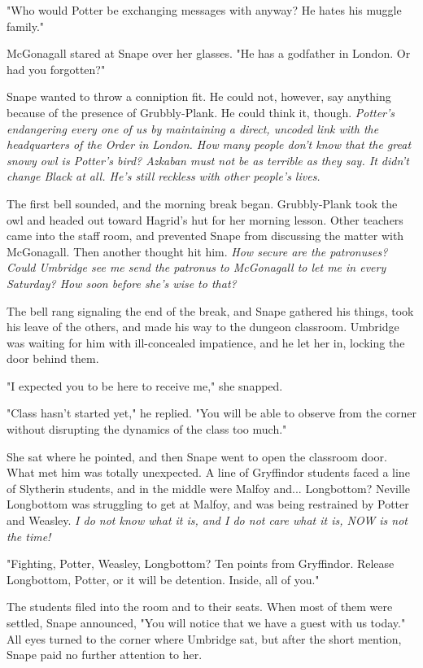 \documentclass[a4paper,11pt]{article}
\begin{document}
"Who would Potter be exchanging messages with anyway? He hates his muggle family."

McGonagall stared at Snape over her glasses. "He has a godfather in London. Or had you forgotten?"

Snape wanted to throw a conniption fit. He could not, however, say anything because of the presence of Grubbly-Plank. He could think it, though. \emph{Potter's endangering every one of us by maintaining a direct, uncoded link with the headquarters of the Order in London. How many people don't know that the great snowy owl is Potter's bird? Azkaban must not be as terrible as they say. It didn't change Black at all. He's still reckless with other people's lives.}

The first bell sounded, and the morning break began. Grubbly-Plank took the owl and headed out toward Hagrid's hut for her morning lesson. Other teachers came into the staff room, and prevented Snape from discussing the matter with McGonagall. Then another thought hit him. \emph{How secure are the patronuses? Could Umbridge see me send the patronus to McGonagall to let me in every Saturday? How soon before she's wise to that?}

The bell rang signaling the end of the break, and Snape gathered his things, took his leave of the others, and made his way to the dungeon classroom. Umbridge was waiting for him with ill-concealed impatience, and he let her in, locking the door behind them.

"I expected you to be here to receive me," she snapped.

"Class hasn't started yet," he replied. "You will be able to observe from the corner without disrupting the dynamics of the class too much."

She sat where he pointed, and then Snape went to open the classroom door. What met him was totally unexpected. A line of Gryffindor students faced a line of Slytherin students, and in the middle were Malfoy and... Longbottom? Neville Longbottom was struggling to get at Malfoy, and was being restrained by Potter and Weasley. \emph{I do not know what it is, and I do not care what it is, NOW is not the time!}

"Fighting, Potter, Weasley, Longbottom? Ten points from Gryffindor. Release Longbottom, Potter, or it will be detention. Inside, all of you."

The students filed into the room and to their seats. When most of them were settled, Snape announced, "You will notice that we have a guest with us today." All eyes turned to the corner where Umbridge sat, but after the short mention, Snape paid no further attention to her.
\end{document}
